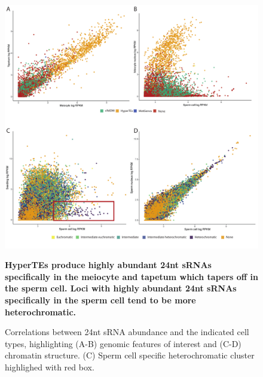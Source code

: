 \begin{figure}[htbp!] 
\centering    
    \includegraphics[width=1\textwidth]{Chapter2/Figs/Figure9_Scatterplots_HyperTEs_chromatin_SC.pdf}
\caption{\textbf{HyperTEs produce highly abundant 24nt sRNAs specifically in the meiocyte and tapetum which tapers off in the sperm cell. Loci with highly abundant 24nt sRNAs specifically in the sperm cell tend to be more heterochromatic.}}
\label{fig:scatter_SC_chromatin}
\captionsetup{font=small}
    \caption*{Correlations between 24nt sRNA abundance and the indicated cell types, highlighting (A-B) genomic features of interest and (C-D) chromatin structure. (C) Sperm cell specific heterochromatic cluster highlighed with red box. }
\end{figure}

